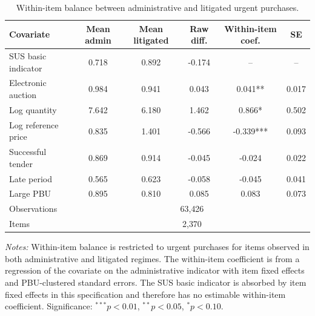 \begin{table}[ht]
\centering
\caption{Within-item balance between administrative and litigated urgent purchases.}
\label{tab:balance_within}
\begin{threeparttable}
\begin{tabular}{lccccc}
\toprule
Covariate & Mean admin & Mean litigated & Raw diff. & Within-item coef. & SE \\
\midrule
SUS basic indicator & 0.718 & 0.892 & -0.174 & -- & -- \\
Electronic auction & 0.984 & 0.941 & 0.043 & 0.041** & 0.017 \\
Log quantity & 7.642 & 6.180 & 1.462 & 0.866* & 0.502 \\
Log reference price & 0.835 & 1.401 & -0.566 & -0.339*** & 0.093 \\
Successful tender & 0.869 & 0.914 & -0.045 & -0.024 & 0.022 \\
Late period & 0.565 & 0.623 & -0.058 & -0.045 & 0.041 \\
Large PBU & 0.895 & 0.810 & 0.085 & 0.083 & 0.073 \\
\midrule
Observations & \multicolumn{5}{c}{63{,}426} \\
Items & \multicolumn{5}{c}{2{,}370} \\
\bottomrule
\end{tabular}
\begin{tablenotes}[flushleft]\footnotesize
\item \textit{Notes:} Within-item balance is restricted to urgent purchases for items observed in both administrative and litigated regimes. The within-item coefficient is from a regression of the covariate on the administrative indicator with item fixed effects and PBU-clustered standard errors. The SUS basic indicator is absorbed by item fixed effects in this specification and therefore has no estimable within-item coefficient. Significance: $^{***}p<0.01$, $^{**}p<0.05$, $^{*}p<0.10$.
\end{tablenotes}
\end{threeparttable}
\end{table}
